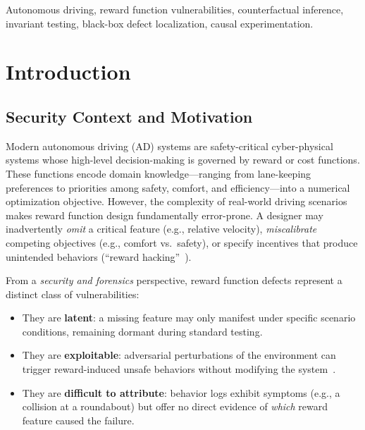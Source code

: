 \documentclass[journal]{IEEEtran}
\theoremstyle{plain}
\theoremstyle{definition}
\theoremstyle{remark}
\begin{document}
\begin{IEEEkeywords}
Autonomous driving, reward function vulnerabilities, counterfactual inference, invariant testing, black-box defect localization, causal experimentation.
\end{IEEEkeywords}

\section{Introduction}
\label{sec:intro}

\subsection{Security Context and Motivation}

Modern autonomous driving (AD) systems are safety-critical cyber-physical systems whose high-level decision-making is governed by reward or cost functions. These functions encode domain knowledge---ranging from lane-keeping preferences to priorities among safety, comfort, and efficiency---into a numerical optimization objective. However, the complexity of real-world driving scenarios makes reward function design fundamentally error-prone. A designer may inadvertently \emph{omit} a critical feature (e.g., relative velocity), \emph{miscalibrate} competing objectives (e.g., comfort vs.\ safety), or specify incentives that produce unintended behaviors (``reward hacking''~\cite{amodei2016specification}).

From a \emph{security and forensics} perspective, reward function defects represent a distinct class of vulnerabilities:
\begin{itemize}[nosep]
    \item They are \textbf{latent}: a missing feature may only manifest under specific scenario conditions, remaining dormant during standard testing.
    \item They are \textbf{exploitable}: adversarial perturbations of the environment can trigger reward-induced unsafe behaviors without modifying the system~\cite{white2023adversarial}.
    \item They are \textbf{difficult to attribute}: behavior logs exhibit symptoms (e.g., a collision at a roundabout) but offer no direct evidence of \emph{which} reward feature caused the failure.
\end{itemize}
\end{document}
